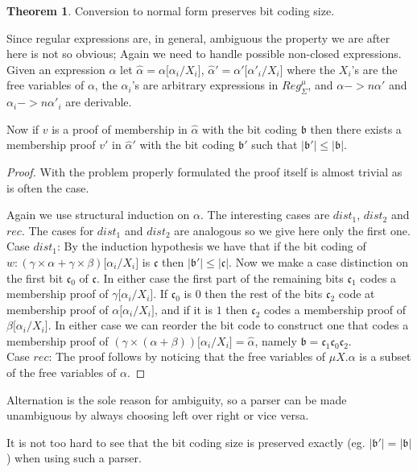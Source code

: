 \documentclass[a4paper, oneside]{memoir}
\theoremstyle{definition}
\newtheorem{theorem}{Theorem}
\begin{document}
\begin{theorem}
  Conversion to normal form preserves bit coding size.

  Since regular expressions are, in general, ambiguous the property we are after
  here is not so obvious; Again we need to handle possible non-closed
  expressions. Given an expression $\alpha$ let $\hat{\alpha} = \alpha \lbrack
  \alpha_i / X_i \rbrack$, $\hat{\alpha}' = \alpha' \lbrack \alpha'_i / X_i
  \rbrack$ where the $X_i$'s are the free variables of $\alpha$, the
  $\alpha_i$'s are arbitrary expressions in $Reg_{\Sigma}^{\mu}$, and $\alpha
  ->n \alpha'$ and $\alpha_i ->n \alpha'_i$ are derivable.

  Now if $v$ is a proof of membership in $\hat{\alpha}$ with the bit coding
  $\mathfrak{b}$ then there exists a membership proof $v'$ in $\hat{\alpha}'$
  with the bit coding $\mathfrak{b'}$ such that $| \mathfrak{b'} | \leq |
  \mathfrak{b} |$.

  \begin{proof}
    With the problem properly formulated the proof itself is almost trivial as
    is often the case.

    Again we use structural induction on $\alpha$. The interesting cases are
    $dist_1$, $dist_2$ and $rec$. The cases for $dist_1$ and $dist_2$ are
    analogous so we give here only the first one.\\[1em]


    Case $dist_1$: By the induction hypothesis we have that if the bit coding of
    $w : (\gamma \times \alpha + \gamma \times \beta)\lbrack \alpha_i / X_i
    \rbrack$ is $\mathfrak{c}$ then $| \mathfrak{b'} | \leq | \mathfrak{c}
    |$. Now we make a case distinction on the first bit $\mathfrak{c_0}$ of
    $\mathfrak{c}$. In either case the first part of the remaining bits
    $\mathfrak{c_1}$ codes a membership proof of $\gamma\lbrack \alpha_i / X_i
    \rbrack$. If $\mathfrak{c_0}$ is $0$ then the rest of the bits
    $\mathfrak{c_2}$ code at membership proof of $\alpha\lbrack \alpha_i / X_i
    \rbrack$, and if it is $1$ then $\mathfrak{c_2}$ codes a membership proof of
    $\beta\lbrack \alpha_i / X_i \rbrack$. In either case we can reorder the bit
    code to construct one that codes a membership proof of $(\gamma \times
    (\alpha + \beta))\lbrack \alpha_i / X_i \rbrack = \hat{\alpha}$, namely
    $\mathfrak{b} = \mathfrak{c_1}\mathfrak{c_0}\mathfrak{c_2}$.\\[1em]

    Case $rec$: The
    proof follows by noticing that the free variables of $\mu X. \alpha$ is a
    subset of the free variables of $\alpha$.
  \end{proof}

  Alternation is the sole reason for ambiguity, so a parser can be made
  unambiguous by always choosing left over right or vice versa.

  It is not too hard to see that the bit coding size is preserved exactly
  (eg. $| \mathfrak{b'} | = | \mathfrak{b} |$) when using such a parser.
\end{theorem}
\end{document}

